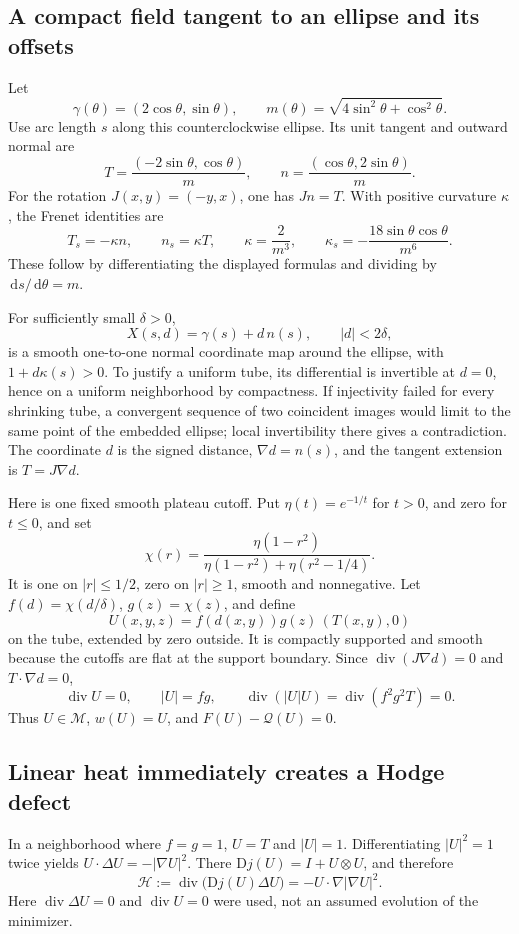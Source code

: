 \documentclass[11pt,a4paper]{article}
\theoremstyle{definition}
\theoremstyle{remark}
\newcommand{\Q}{\mathcal Q}
\newcommand{\M}{\mathcal M}
\newcommand{\dd}{\,\mathrm d}
\newcommand{\diver}{\operatorname{div}}
\numberwithin{equation}{section}
\begin{document}
\subsection{A compact field tangent to an ellipse and its offsets}
Let
\[
\gamma(\theta)=(2\cos\theta,\sin\theta),\qquad
m(\theta)=\sqrt{4\sin^2\theta+\cos^2\theta}.
\]
Use arc length \(s\) along this counterclockwise ellipse. Its unit tangent and outward normal are
\[
T=\frac{(-2\sin\theta,\cos\theta)}m,
\qquad n=\frac{(\cos\theta,2\sin\theta)}m.
\]
For the rotation \(J(x,y)=(-y,x)\), one has \(Jn=T\). With positive curvature \(\kappa\), the Frenet identities are
\begin{equation}\label{eq:frenet}
T_s=-\kappa n,\qquad n_s=\kappa T,
\qquad \kappa=\frac2{m^3},\qquad
\kappa_s=-\frac{18\sin\theta\cos\theta}{m^6}.
\end{equation}
These follow by differentiating the displayed formulas and dividing by \(\dd s/\dd\theta=m\).

For sufficiently small \(\delta>0\),
\[
X(s,d)=\gamma(s)+d\,n(s),\qquad |d|<2\delta,
\]
is a smooth one-to-one normal coordinate map around the ellipse, with \(1+d\kappa(s)>0\). To justify a uniform tube, its differential is invertible at \(d=0\), hence on a uniform neighborhood by compactness. If injectivity failed for every shrinking tube, a convergent sequence of two coincident images would limit to the same point of the embedded ellipse; local invertibility there gives a contradiction. The coordinate \(d\) is the signed distance, \(\nabla d=n(s)\), and the tangent extension is \(T=J\nabla d\).

Here is one fixed smooth plateau cutoff. Put \(\eta(t)=e^{-1/t}\) for \(t>0\), and zero for \(t\le0\), and set
\[
\chi(r)=\frac{\eta(1-r^2)}{\eta(1-r^2)+\eta(r^2-1/4)}.
\]
It is one on \(|r|\le1/2\), zero on \(|r|\ge1\), smooth and nonnegative. Let \(f(d)=\chi(d/\delta)\), \(g(z)=\chi(z)\), and define
\begin{equation}\label{eq:ellipseU}
U(x,y,z)=f(d(x,y))g(z)\,(T(x,y),0)
\end{equation}
on the tube, extended by zero outside. It is compactly supported and smooth because the cutoffs are flat at the support boundary. Since \(\diver(J\nabla d)=0\) and \(T\cdot\nabla d=0\),
\[
\diver U=0,
\qquad |U|=fg,
\qquad \diver(|U|U)=\diver(f^2g^2T)=0.
\]
Thus \(U\in\M\), \(w(U)=U\), and \(F(U)-\Q(U)=0\).

\subsection{Linear heat immediately creates a Hodge defect}
In a neighborhood where \(f=g=1\), \(U=T\) and \(|U|=1\). Differentiating \(|U|^2=1\) twice yields
\(U\cdot\Delta U=-|\nabla U|^2\).
There \(\mathrm Dj(U)=I+U\otimes U\), and therefore
\begin{equation}\label{eq:heatH}
\mathscr H:=\diver\bigl(\mathrm Dj(U)\Delta U\bigr)
=-U\cdot\nabla|\nabla U|^2.
\end{equation}
Here \(\diver\Delta U=0\) and \(\diver U=0\) were used, not an assumed evolution of the minimizer.
\end{document}
